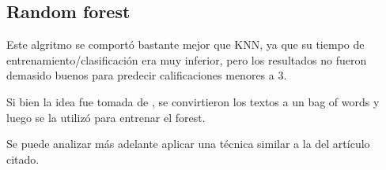 
\subsection{Random forest}

Este algritmo se comportó bastante mejor que KNN, ya que su tiempo de entrenamiento/clasificación
era muy inferior, pero los resultados no fueron demasido buenos para predecir calificaciones menores
a 3. 

Si bien la idea fue tomada de \cite{random_forest_movie_reviews}, se convirtieron los textos a un
bag of words y luego se la utilizó para entrenar el forest.

Se puede analizar más adelante aplicar una técnica similar a la del artículo citado.
